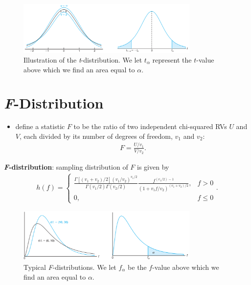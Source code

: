 \documentclass[10pt]{article}
\begin{document}
\begin{figure}[h]
    \centering
    \includegraphics[width=0.8\textwidth]{tDistribution}
    \caption{Illustration of the \textit{t}-distribution. We let $t_\alpha$ represent the $t$-value above which we find an area equal to $\alpha$.}
    \label{fig:tDistribution}
\end{figure}


\section{\textit{F}-Distribution}
\begin{itemize}
    \item define a statistic $F$ to be the ratio of two independent chi-squared RVs $U$ and $V$, each divided by its number of degrees of freedom, $v_1$ and $v_2$:
        \begin{gather*}
            F = \frac{U / v_1}{V / v_2}
        .\end{gather*}
\end{itemize}
\begin{definition}
    \textbf{\textit{F}-distribution}: sampling distribution of $F$ is given by
    \begin{gather*}
        h(f) =
        \begin{cases}
            \frac{\Gamma[(v_1+v_2) / 2](v_1 / v_2)^{v_1 / 2}}{\Gamma(v_1 / 2) \Gamma(v_2 / 2)} \frac{f^{(v_1 / 2)-1}}{(1+v_1f / v_2)^{(v_1+v_2) / 2}} , & f > 0 \\
            0, & f \le 0
        \end{cases}
    .\end{gather*}
\end{definition}
\begin{figure}[h]
    \centering
    \includegraphics[width=0.8\textwidth]{fDistribution}
    \caption{Typical \textit{F}-distributions. We let $f_\alpha$ be the $f$-value above which we find an area equal to $\alpha$.}
    \label{fig:fDistribution}
\end{figure}
\end{document}
